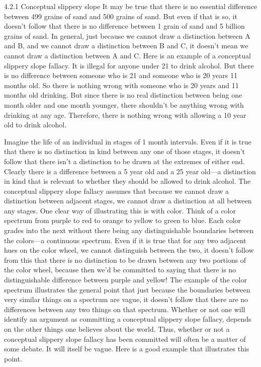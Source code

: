 
4.2.1 Conceptual slippery slope
It may be true that there is no essential difference between 499 grains of sand
and 500 grains of sand. But even if that is so, it doesn’t follow that there is no
difference between 1 grain of sand and 5 billion grains of sand. In general, just
because we cannot draw a distinction between A and B, and we cannot draw a
distinction between B and C, it doesn’t mean we cannot draw a distinction
between A and C. Here is an example of a conceptual slippery slope fallacy.
It is illegal for anyone under 21 to drink alcohol. But there is no
difference between someone who is 21 and someone who is 20 years 11
months old. So there is nothing wrong with someone who is 20 years and
11 months old drinking. But since there is no real distinction between
being one month older and one month younger, there shouldn’t be
anything wrong with drinking at any age. Therefore, there is nothing
wrong with allowing a 10 year old to drink alcohol.

Imagine the life of an individual in stages of 1 month intervals. Even if it is true
that there is no distinction in kind between any one of those stages, it doesn’t
follow that there isn’t a distinction to be drawn at the extremes of either end.
Clearly there is a difference between a 5 year old and a 25 year old—a
distinction in kind that is relevant to whether they should be allowed to drink
alcohol. The conceptual slippery slope fallacy assumes that because we cannot
draw a distinction between adjacent stages, we cannot draw a distinction at all
between any stages. One clear way of illustrating this is with color. Think of a
color spectrum from purple to red to orange to yellow to green to blue. Each
color grades into the next without there being any distinguishable boundaries
between the colors—a continuous spectrum. Even if it is true that for any two
adjacent hues on the color wheel, we cannot distinguish between the two, it
doesn’t follow from this that there is no distinction to be drawn between any two
portions of the color wheel, because then we’d be committed to saying that
there is no distinguishable difference between purple and yellow! The example
of the color spectrum illustrates the general point that just because the
boundaries between very similar things on a spectrum are vague, it doesn’t
follow that there are no differences between any two things on that spectrum.
Whether or not one will identify an argument as committing a conceptual
slippery slope fallacy, depends on the other things one believes about the world.
Thus, whether or not a conceptual slippery slope fallacy has been committed will
often be a matter of some debate. It will itself be vague. Here is a good
example that illustrates this point.

